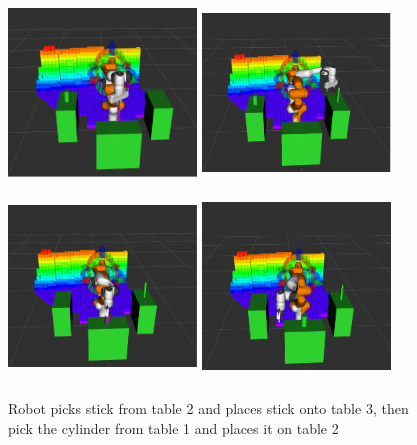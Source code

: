 \documentclass[a4paper,12pt]{article}
\begin{document}
\begin{figure}[H]
    \centering
    \includegraphics[width=5cm, height=5cm]{images/Q3/2_pickStick.png}
    \includegraphics[width=5cm, height=5cm]{images/Q3/2_placeStick.png}\\
    \includegraphics[width=5cm, height=5cm]{images/Q3/2_pickCylinder.png}
    \includegraphics[width=5cm, height=5cm]{images/Q3/2_placeCylinder.png}
    \caption{Robot picks stick from table 2 and places stick onto table 3, then pick the cylinder from table 1 and places it on table 2}
    \label{fig:2_pickPlace}
\end{figure}
\end{document}
